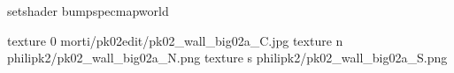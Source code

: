 setshader bumpspecmapworld

texture 0 morti/pk02edit/pk02_wall_big02a_C.jpg
texture n philipk2/pk02_wall_big02a_N.png
texture s philipk2/pk02_wall_big02a_S.png

